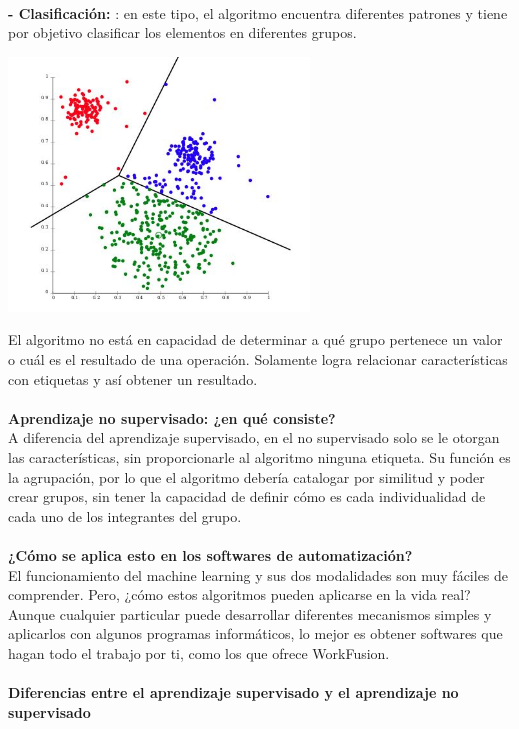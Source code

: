 \documentclass[%
 reprint,
 amsmath,amssymb,
 aps,
]{revtex4-1}
\begin{document}
 \textbf{}\\  
 \textbf{-  Clasificación: } 
: en este tipo, el algoritmo encuentra diferentes patrones y tiene por objetivo clasificar los elementos en diferentes grupos.
 \begin{center}
\includegraphics[width=8cm]{./Imagenes/clasificacion10}
\end{center}
El algoritmo no está en capacidad de determinar a qué grupo pertenece un valor o cuál es el resultado de una operación. Solamente logra relacionar características con etiquetas y así obtener un resultado.
 \textbf{}\\  
 \textbf{}\\  
\textbf{Aprendizaje no supervisado: ¿en qué consiste?} \\
A diferencia del aprendizaje supervisado, en el no supervisado solo se le otorgan las características, sin proporcionarle al algoritmo ninguna etiqueta. Su función es la agrupación, por lo que el algoritmo debería catalogar por similitud y poder crear grupos, sin tener la capacidad de definir cómo es cada individualidad de cada uno de los integrantes del grupo. \\
 \\
\textbf{¿Cómo se aplica esto en los softwares de automatización?} \\
El funcionamiento del machine learning y sus dos modalidades son muy fáciles de comprender. Pero, ¿cómo estos algoritmos pueden aplicarse en la vida real? Aunque cualquier particular puede desarrollar diferentes mecanismos simples y aplicarlos con algunos programas informáticos, lo mejor es obtener softwares que hagan todo el trabajo por ti, como los que ofrece WorkFusion.
\textbf{}\\  
\textbf{}\\  
\textbf{Diferencias entre el aprendizaje supervisado y el aprendizaje no supervisado} \\
\end{document}
